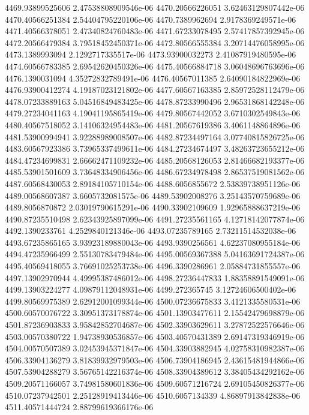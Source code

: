 {4469.93899525606 2.47538808909546e-06
4470.20566226051 3.62463129807442e-06
4470.40566251384 2.54404795220106e-06
4470.7389962694 2.9178369249571e-06
4471.40566378051 2.47340824760483e-06
4471.67233078495 2.57417857392945e-06
4472.20566479384 3.79518452450371e-06
4472.80566555384 3.20714476058995e-06
4473.1389993094 2.1292717335517e-06
4473.93900032273 2.41087919480595e-06
4474.60566783385 2.69542620450326e-06
4475.40566884718 3.06048696763696e-06
4476.1390031094 4.35272832789491e-06
4476.40567011385 2.64090184822969e-06
4476.93900412274 4.19187023121802e-06
4477.60567163385 2.85972528112479e-06
4478.07233889163 5.04516849483425e-06
4478.87233990496 2.96531868142248e-06
4479.27234041163 4.19041195865419e-06
4479.80567442052 3.6710302549843e-06
4480.40567518052 3.14106324954483e-06
4481.20567619386 3.4061148864896e-06
4481.53900994941 3.92288989008507e-06
4482.87234497164 3.07740815826725e-06
4483.60567923386 3.73965337499611e-06
4484.27234674497 3.48263723655212e-06
4484.47234699831 2.66662471109232e-06
4485.20568126053 2.81466682193377e-06
4485.53901501609 3.73648334906456e-06
4486.67234978498 2.86537519081562e-06
4487.60568430053 2.89184105710154e-06
4488.6056855672 2.53839738951126e-06
4489.00568607387 3.6605732081575e-06
4489.53902008276 3.25143570759689e-06
4489.8056870872 2.03019790615291e-06
4490.33902109609 1.92965888637219e-06
4490.87235510498 2.62343925897099e-06
4491.27235561165 4.12718142077874e-06
4492.1390233761 4.2529840121346e-06
4493.07235789165 2.73211514532038e-06
4493.67235865165 3.93923189880043e-06
4493.9390256561 4.62237080955184e-06
4494.47235966499 2.55130783479484e-06
4495.00569367388 5.04163691724387e-06
4495.40569418055 3.76691025253738e-06
4496.3390286961 2.05884731855557e-06
4497.13902970944 4.49995387486012e-06
4498.27236447833 1.88358891549091e-06
4499.13903224277 4.09879112048931e-06
4499.272365745 3.12724606500402e-06
4499.80569975389 2.62912001099344e-06
4500.07236675833 3.4121335580531e-06
4500.60570076722 3.30951373178874e-06
4501.13903477611 2.15542479698879e-06
4501.87236903833 3.95842852704687e-06
4502.33903629611 3.27872522576646e-06
4503.00570380722 1.94738930536857e-06
4503.40570431389 2.69147319346919e-06
4504.00570507389 3.02453945371847e-06
4504.33903882945 4.02758310982387e-06
4506.33904136279 3.81839932979503e-06
4506.73904186945 2.43615481944866e-06
4507.53904288279 3.56765142216374e-06
4508.33904389612 3.38405434292162e-06
4509.20571166057 3.74981580601836e-06
4509.60571216724 2.69105450826377e-06
4510.07237942501 2.25128919413446e-06
4510.6057134339 4.86897913842838e-06
4511.40571444724 2.88799619366176e-06
}
